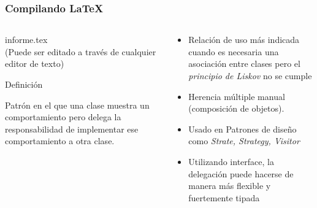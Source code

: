 

\begin{frame}
   \frametitle{\textbf{Compilando \LaTeX{} }}
 
\begin{columns}[onlytextwidth]
    \begin{column}{0.34\textwidth}
     \centering
     { \ttfamily informe.tex }  \\
     (Puede ser editado a través de cualquier editor de texto)
   \begin{exampleblock}{Definición} %
    \begin{center}
        Patrón en el que una clase muestra un comportamiento pero delega la responsabilidad de implementar ese comportamiento a otra clase. 
   \end{center}
    \end{exampleblock}
   
      
    \end{column}
    \begin{column}{0.56\textwidth}
    \begin{exampleblock}{} %

 \begin{itemize}
 \item  Relación de uso más indicada cuando es necesaria una asociación entre clases pero el \textit{principio de Liskov} no se cumple
        \item  Herencia múltiple manual (composición de objetos). 
        \item  Usado en Patrones de diseño como \textit{Strate, Strategy, Visitor}
        
        \item %
        Utilizando interface, la delegación puede hacerse de manera más flexible y fuertemente tipada
    \end{itemize}

    \end{exampleblock}
    \end{column}
  \end{columns} 
\end{frame}
